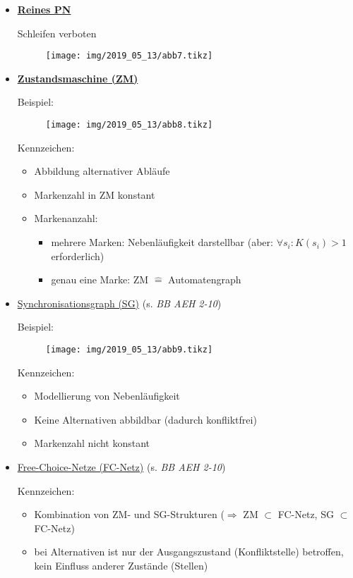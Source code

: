 \begin{itemize}
	\item \textbf{\underline{Reines PN}}
	
	Schleifen verboten
	\begin{figure}[H]
		\centering
		\texttt{[image: img/2019\_05\_13/abb7.tikz]}
	\end{figure}
	
	\item \textbf{\underline{Zustandsmaschine (ZM)}}
	
	Beispiel:
	\begin{figure}[H]
		\centering
		\texttt{[image: img/2019\_05\_13/abb8.tikz]}
	\end{figure}
	
	Kennzeichen:
	\begin{itemize}
		\item Abbildung alternativer Abläufe
		\item Markenzahl in ZM konstant
		\item Markenanzahl:
		\begin{itemize}
			\item mehrere Marken: Nebenläufigkeit darstellbar (aber: $\forall s_i: K(s_i)>1$ erforderlich)
			\item genau eine Marke: ZM $\hat{=}$ Automatengraph
		\end{itemize}
	\end{itemize}

	\item \underline{Synchronisationsgraph (SG)} (s. \textit{BB AEH 2-10})
	
	Beispiel:
	\begin{figure}[H]
		\centering
		\texttt{[image: img/2019\_05\_13/abb9.tikz]}
	\end{figure}
	
	Kennzeichen:
	\begin{itemize}
		\item Modellierung von Nebenläufigkeit
		\item Keine Alternativen abbildbar (dadurch konfliktfrei)
		\item Markenzahl nicht konstant
	\end{itemize}

	\item \underline{Free-Choice-Netze (FC-Netz)} (s. \textit{BB AEH 2-10})
	
	Kennzeichen:
	\begin{itemize}
		\item Kombination von ZM- und SG-Strukturen \newline ($\Rightarrow$ ZM $\subset$ FC-Netz, SG $\subset$ FC-Netz)
		\item bei Alternativen ist nur der Ausgangszustand (Konfliktstelle) betroffen, kein Einfluss anderer Zustände (Stellen)
	\end{itemize}
\end{itemize}

